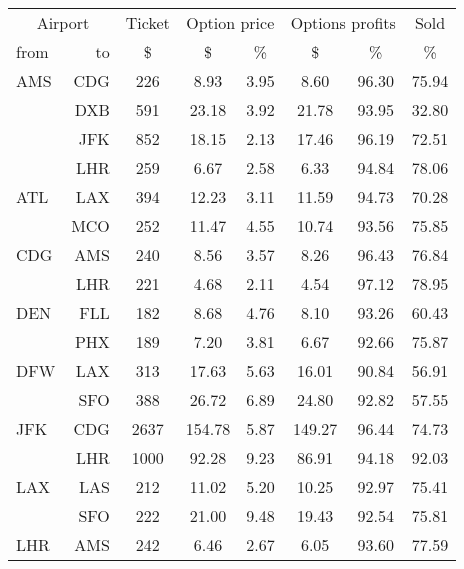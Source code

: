 \begin{table}[h]
    \begin{center}
        \begin{tabular}{l r c c c c c c}
            \toprule
            \multicolumn{2}{c}{Airport}  &  Ticket & \multicolumn{2}{c}{Option price} & \multicolumn{2}{c}{Options profits}  &  Sold  \\[.4ex]
            from  &  to  &  \$   &  \$  & \%  &  \$  & \%  & \%  \\
            \midrule
AMS  &  CDG  &     226  &    8.93  &   3.95  &    8.60  &   96.30  &   75.94 \\
~    &  DXB  &     591  &   23.18  &   3.92  &   21.78  &   93.95  &   32.80 \\
~    &  JFK  &     852  &   18.15  &   2.13  &   17.46  &   96.19  &   72.51 \\
~    &  LHR  &     259  &    6.67  &   2.58  &    6.33  &   94.84  &   78.06 \\[.5ex]
ATL  &  LAX  &     394  &   12.23  &   3.11  &   11.59  &   94.73  &   70.28 \\
~    &  MCO  &     252  &   11.47  &   4.55  &   10.74  &   93.56  &   75.85 \\[.5ex]
CDG  &  AMS  &     240  &    8.56  &   3.57  &    8.26  &   96.43  &   76.84 \\
~    &  LHR  &     221  &    4.68  &   2.11  &    4.54  &   97.12  &   78.95 \\[.5ex]
DEN  &  FLL  &     182  &    8.68  &   4.76  &    8.10  &   93.26  &   60.43 \\
~    &  PHX  &     189  &    7.20  &   3.81  &    6.67  &   92.66  &   75.87 \\[.5ex]
DFW  &  LAX  &     313  &   17.63  &   5.63  &   16.01  &   90.84  &   56.91 \\
~    &  SFO  &     388  &   26.72  &   6.89  &   24.80  &   92.82  &   57.55 \\[.5ex]
JFK  &  CDG  &    2637  &  154.78  &   5.87  &  149.27  &   96.44  &   74.73 \\
~    &  LHR  &    1000  &   92.28  &   9.23  &   86.91  &   94.18  &   92.03 \\[.5ex]
LAX  &  LAS  &     212  &   11.02  &   5.20  &   10.25  &   92.97  &   75.41 \\
~    &  SFO  &     222  &   21.00  &   9.48  &   19.43  &   92.54  &   75.81 \\[.5ex]
LHR  &  AMS  &     242  &    6.46  &   2.67  &    6.05  &   93.60  &   77.59 \\

\end{tabular}
\end{center}
\end{table}
